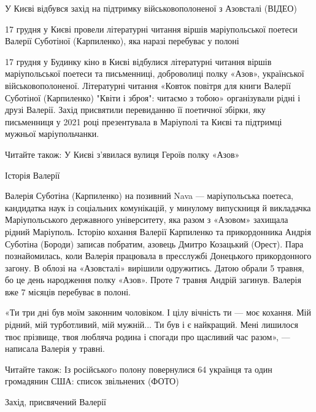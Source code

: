  
 
 
 
 

У Києві відбувся захід на підтримку військовополоненої з Азовсталі (ВІДЕО)

17 грудня у Києві провели літературні читання віршів маріупольської поетеси Валерії Суботіної
(Карпиленко), яка наразі перебуває у полоні

17 грудня у Будинку кіно в Києві відбулися літературні читання віршів
маріупольської поетеси та письменниці, доброволиці полку «Азов», української
військовополоненої. Літературні читання «Ковток повітря для книги Валерії
Суботіної (Карпиленко) "Квіти і зброя": читаємо з тобою» організували рідні і
друзі Валерії. Захід присвятили перевиданню її поетичної збірки, яку
письменниця у 2021 році презентувала в Маріуполі та Києві та підтримці мужньої
маріупольчанки.

Читайте також: У Києві з'явилася вулиця Героїв полку «Азов»

Історія Валерії

Валерія Суботіна (Карпиленко) на позивний Nava — маріупольська поетеса,
кандидатка наук із соціальних комунікацій, у минулому випускниця й викладачка
Маріупольського державного університету, яка разом з «Азовом» захищала рідний
Маріуполь. Історію кохання Валерії Карпиленко та прикордонника Андрія Суботіна
(Бороди) записав побратим, азовець Дмитро Козацький (Орест). Пара
познайомилась, коли Валерія працювала в пресслужбі Донецького прикордонного
загону. В облозі на «Азовсталі» вирішили одружитись. Датою обрали 5 травня, бо
це день народження полку «Азов». Проте 7 травня Андрій загинув. Валерія вже 7
місяців перебуває в полоні.

«Ти три дні був моїм законним чоловіком. І цілу вічність ти — моє кохання. Мій
рідний, мій турботливий, мій мужній... Ти був і є найкращий. Мені лишилося твоє
прізвище, твоя любляча родина і спогади про щасливий час разом», — написала
Валерія у травні. 

Читайте також: Із російськогo полону повернулися 64 українця та один громадянин США: список звільнених (ФОТО)

Захід, присвячений Валерії

